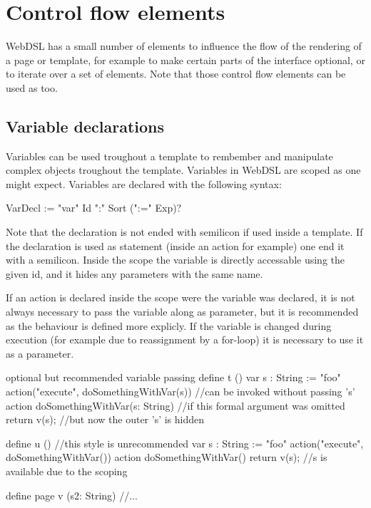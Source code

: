 \chapter{Control flow elements}
WebDSL has a small number of elements to influence the flow of the rendering of a page or template, for example to make certain parts of the interface optional, or to iterate over a set of elements. Note that those control flow elements can be used as  too. 

\section{Variable declarations}
Variables can be used troughout a template to rembember and manipulate complex objects troughout the template. Variables in WebDSL are scoped as one might expect. Variables are declared with the following syntax:
\begin{shell}
VarDecl := "var" Id ":" Sort (":=" Exp)?
\end{shell}
Note that the declaration is not ended with semilicon if used inside a template. If the declaration is used as statement (inside an action for example) one  end it with a semilicon. Inside the scope the variable is directly accessable using the given id, and it hides any parameters with the same name. 

If an action is declared inside the scope were the variable was declared, it is not always necessary to pass the variable along as parameter, but it is recommended as the behaviour is defined more explicly. If the variable is changed during execution (for example due to reassignment by a for-loop) it is necessary to use it as a parameter. 
\begin{webdsl}{optional but recommended variable passing}
define t () {
	var s : String := "foo"
	action("execute", doSomethingWithVar(s))	
			//can be invoked without passing 's'
	action doSomethingWithVar(s: String) { 		
			//if this formal argument was omitted
		return v(s); 														
			//but now the outer 's' is hidden
	}
}

define u () {																
			//this style is unrecommended
	var s : String := "foo"
	action("execute", doSomethingWithVar())		
	action doSomethingWithVar() { 		
		return v(s); 														
			//s is available due to the scoping
	}
}

define page v (s2: String) {
	//...
}
\end{webdsl}

